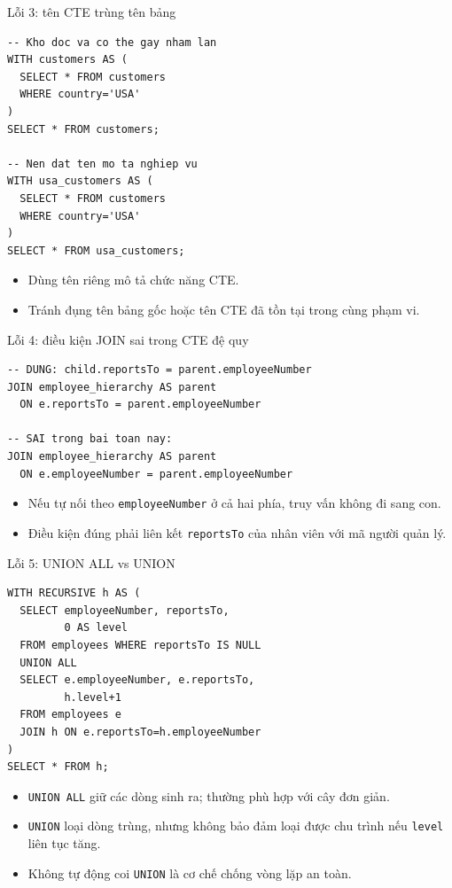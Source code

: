 \documentclass[aspectratio=169,10pt]{beamer}
\newcommand{\code}[1]{\texttt{#1}}
\begin{document}
\begin{frame}[fragile]{Lỗi 3: tên CTE trùng tên bảng}
\small
\begin{lstlisting}[basicstyle=\ttfamily\scriptsize]
-- Kho doc va co the gay nham lan
WITH customers AS (
  SELECT * FROM customers
  WHERE country='USA'
)
SELECT * FROM customers;

-- Nen dat ten mo ta nghiep vu
WITH usa_customers AS (
  SELECT * FROM customers
  WHERE country='USA'
)
SELECT * FROM usa_customers;
\end{lstlisting}
\vspace{.1em}
\begin{itemize}
\item Dùng tên riêng mô tả chức năng CTE.
\item Tránh đụng tên bảng gốc hoặc tên CTE đã tồn tại trong cùng phạm vi.
\end{itemize}
\end{frame}

\begin{frame}[fragile]{Lỗi 4: điều kiện JOIN sai trong CTE đệ quy}
\small
\begin{lstlisting}[basicstyle=\ttfamily\scriptsize]
-- DUNG: child.reportsTo = parent.employeeNumber
JOIN employee_hierarchy AS parent
  ON e.reportsTo = parent.employeeNumber

-- SAI trong bai toan nay:
JOIN employee_hierarchy AS parent
  ON e.employeeNumber = parent.employeeNumber
\end{lstlisting}
\vspace{.1em}
\begin{itemize}
\item Nếu tự nối theo \code{employeeNumber} ở cả hai phía, truy vấn không đi sang con.
\item Điều kiện đúng phải liên kết \code{reportsTo} của nhân viên với mã người quản lý.
\end{itemize}
\end{frame}

\begin{frame}[fragile]{Lỗi 5: UNION ALL vs UNION}
\small
\begin{lstlisting}[basicstyle=\ttfamily\scriptsize]
WITH RECURSIVE h AS (
  SELECT employeeNumber, reportsTo,
         0 AS level
  FROM employees WHERE reportsTo IS NULL
  UNION ALL
  SELECT e.employeeNumber, e.reportsTo,
         h.level+1
  FROM employees e
  JOIN h ON e.reportsTo=h.employeeNumber
)
SELECT * FROM h;
\end{lstlisting}
\vspace{.1em}
\begin{itemize}
\item \code{UNION ALL} giữ các dòng sinh ra; thường phù hợp với cây đơn giản.
\item \code{UNION} loại dòng trùng, nhưng không bảo đảm loại được chu trình nếu \code{level} liên tục tăng.
\item Không tự động coi \code{UNION} là cơ chế chống vòng lặp an toàn.
\end{itemize}
\end{frame}
\end{document}
